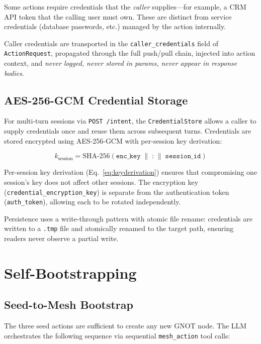 \documentclass[10pt,twocolumn]{article}
\begin{document}
Some actions require credentials that the \emph{caller} supplies---for
example, a CRM API token that the calling user must own. These are
distinct from service credentials (database passwords, etc.) managed by
the action internally.

Caller credentials are transported in the \texttt{caller\_credentials}
field of \texttt{ActionRequest}, propagated through the full push/pull
chain, injected into action context, and \emph{never logged, never
stored in params, never appear in response bodies}.

\subsection{AES-256-GCM Credential Storage}

For multi-turn sessions via \texttt{POST /intent}, the
\texttt{CredentialStore} allows a caller to supply credentials once and
reuse them across subsequent turns. Credentials are stored encrypted
using AES-256-GCM with per-session key derivation:

\begin{equation}
k_{\text{session}} = \text{SHA-256}(\texttt{enc\_key} \;\|\; \texttt{:} \;\|\; \texttt{session\_id})
\label{eq:keyderivation}
\end{equation}

Per-session key derivation (Eq.~\ref{eq:keyderivation}) ensures that
compromising one session's key does not affect other sessions. The
encryption key (\texttt{credential\_encryption\_key}) is separate from
the authentication token (\texttt{auth\_token}), allowing each to be
rotated independently.

Persistence uses a write-through pattern with atomic file rename:
credentials are written to a \texttt{.tmp} file and atomically renamed
to the target path, ensuring readers never observe a partial write.

\FloatBarrier
\section{Self-Bootstrapping}
\label{sec:bootstrap}

\subsection{Seed-to-Mesh Bootstrap}

The three seed actions are sufficient to create any new GNOT node. The
LLM orchestrates the following sequence via sequential \texttt{mesh\_action}
tool calls:
\end{document}
